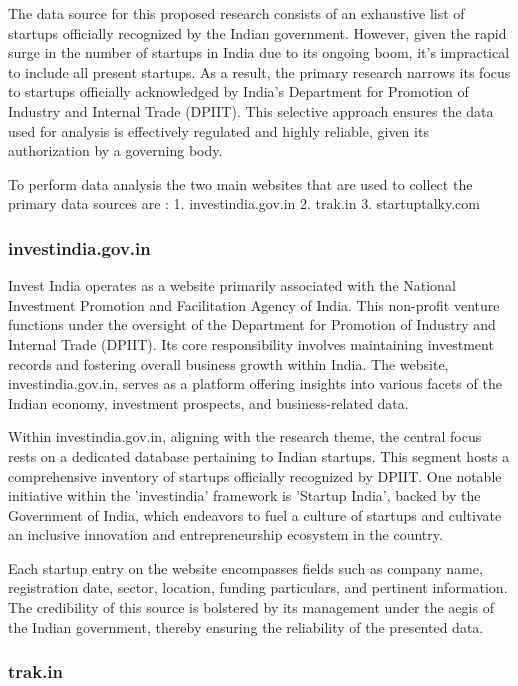 \documentclass[12pt]{article}
\begin{document}
The data source for this proposed research consists of an exhaustive list of startups officially recognized by the Indian government. However, given the rapid surge in the number of startups in India due to its ongoing boom, it's impractical to include all present startups. As a result, the primary research narrows its focus to startups officially acknowledged by India's Department for Promotion of Industry and Internal Trade (DPIIT). This selective approach ensures the data used for analysis is effectively regulated and highly reliable, given its authorization by a governing body.

To perform data analysis the two main websites that are used to collect the primary data sources are :
1. investindia.gov.in
2. trak.in
3. startuptalky.com


\subsubsection{investindia.gov.in}

Invest India operates as a website primarily associated with the National Investment Promotion and Facilitation Agency of India. This non-profit venture functions under the oversight of the Department for Promotion of Industry and Internal Trade (DPIIT). Its core responsibility involves maintaining investment records and fostering overall business growth within India. The website, investindia.gov.in, serves as a platform offering insights into various facets of the Indian economy, investment prospects, and business-related data.

Within investindia.gov.in, aligning with the research theme, the central focus rests on a dedicated database pertaining to Indian startups. This segment hosts a comprehensive inventory of startups officially recognized by DPIIT. One notable initiative within the 'investindia' framework is 'Startup India', backed by the Government of India, which endeavors to fuel a culture of startups and cultivate an inclusive innovation and entrepreneurship ecosystem in the country.

Each startup entry on the website encompasses fields such as company name, registration date, sector, location, funding particulars, and pertinent information. The credibility of this source is bolstered by its management under the aegis of the Indian government, thereby ensuring the reliability of the presented data.

\subsubsection{trak.in}
\end{document}
